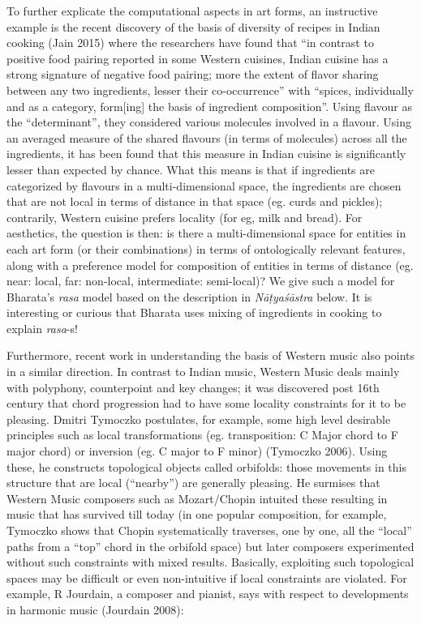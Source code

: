 To further explicate the computational aspects in art forms, an instructive example is the recent discovery of the basis of diversity of recipes in Indian cooking (Jain 2015) where the researchers have found that “in contrast to positive food pairing reported in some Western cuisines, Indian cuisine has a strong signature of negative food pairing; more the extent of flavor sharing between any two ingredients, lesser their co-occurrence” with “spices, individually and as a category, form[ing] the basis of ingredient composition”. Using flavour as the “determinant”, they considered various molecules involved in a flavour. Using an averaged measure of the shared flavours (in terms of molecules) across all the ingredients, it has been found that this measure in Indian cuisine is significantly lesser than expected by chance. What this means is that if ingredients are categorized by flavours in a multi-dimensional space, the ingredients are chosen that are not local in terms of distance in that space (eg. curds and pickles); contrarily, Western cuisine prefers locality (for eg, milk and bread). For aesthetics, the question is then: is there a multi-dimensional space for entities in each art form (or their combinations) in terms of ontologically relevant features, along with a preference model for composition of entities in terms of distance (eg. near: local, far: non-local, intermediate: semi-local)? We give such a model for Bharata’s \textsl{rasa} model based on the description in \textsl{Nāṭyaśāstra} below. It is interesting or curious that Bharata uses mixing of ingredients in cooking to explain \textsl{rasa}-s!  

Furthermore, recent work in understanding the basis of Western music also points in a similar direction. In contrast to Indian music, Western Music deals mainly with polyphony, counterpoint and key changes; it was discovered post 16th century that chord progression had to have some locality constraints for it to be pleasing. Dmitri Tymoczko postulates, for example, some high level desirable principles such as local transformations (eg. transposition: C Major chord to F major chord) or inversion (eg. C major to F minor) (Tymoczko 2006). Using these, he constructs topological objects called orbifolds: those movements in this structure that are local (“nearby”) are generally pleasing. He surmises that Western Music composers such as Mozart/Chopin intuited these resulting in music that has survived till today (in one popular composition, for example, Tymoczko shows that Chopin systematically traverses, one by one, all the “local” paths from a “top” chord in the orbifold space) but later composers experimented without such constraints with mixed results. Basically, exploiting such topological spaces may be difficult or even non-intuitive if local constraints are violated. For example, R Jourdain, a composer and pianist, says with respect to developments in harmonic music (Jourdain 2008): 

